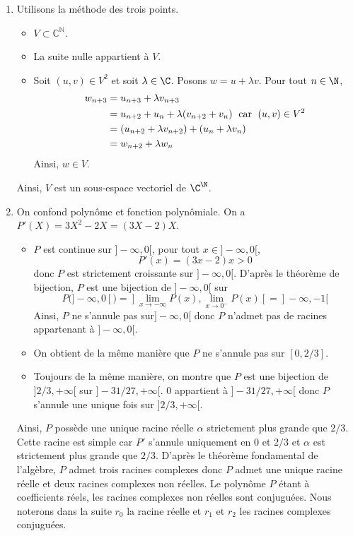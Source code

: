 \documentclass[a4paper,10pt]{report}
\begin{document}
\corr \begin{enumerate}
 \item Utilisons la méthode des trois points.
 \begin{itemize}
 \item $V \subset \mathbb{C}^{\mathbb{N}}$.
 \item La suite nulle appartient à $V$.
 \item Soit $(u,v)\in V^2$ et soit $\lambda\in\C$. Posons $w=u + \lambda v$. Pour tout $n\in\N$, 
 \begin{align*}
 w_{n+3} & =u_{n+3}+\lambda v_{n+3} \\
 & =u_{n+2}+u_n+\lambda(v_{n+2}+v_n) \; \hbox{ car } \; (u,v)\in V^2 \\
 & =(u_{n+2}+\lambda v_{n+2})+(u_n+\lambda v_n) \\
 & =w_{n+2}+\lambda w_n
 \end{align*}
 Ainsi, $w \in V$. 
 \end{itemize}
Ainsi, $V$ est un sous-espace vectoriel de $\C^\N$.
 \item On confond polynôme et fonction polynômiale. On a $P'(X)=3X^2-2X=(3X-2)X$.
 \begin{itemize}
\item $P$ est continue sur $]-\infty,0[$, pour tout $x \in ]-\infty,0[$,
$$ P'(x) = (3x-2)x>0$$
donc $P$ est strictement croissante sur $]-\infty,0[$. D'après le théorème de bijection, $P$ est une bijection de $]-\infty,0[$ sur 
$$ P(]-\infty,0[)=  ]\lim_{x \rightarrow - \infty} P(x), \lim_{x \rightarrow 0^{-}} P(x)[=   ]-\infty,-1[$$
Ainsi, $P$ ne s'annule pas sur$]-\infty,0[$ donc $P$ n'admet pas de racines appartenant à $]-\infty,0[$.
\item On obtient de la même manière que $P$ ne s'annule pas sur $[0, 2/3]$.
\item Toujours de la même manière, on montre que $P$ est une bijection de $]2/3, + \infty[$ sur $]-31/27,+\infty[$. $0$ appartient à $]-31/27,+\infty[$ donc $P$ s'annule une unique fois sur $]2/3, + \infty[$.
\end{itemize}
Ainsi, $P$ possède une unique racine réelle $\alpha$ strictement plus grande que $2/3$. Cette racine est simple car $P'$ s'annule uniquement en $0$ et $2/3$ et $\alpha$ est strictement plus grande que $2/3$. D'après le théorème fondamental de l'algèbre, $P$ admet trois racines complexes donc $P$ admet une unique racine réelle et deux racines complexes non réelles. Le polynôme $P$ étant à coefficients réels, les racines complexes non réelles sont conjuguées. Nous noterons dans la suite $r_0$ la racine réelle et $r_1$ et $r_2$ les racines complexes conjuguées.

\end{enumerate}
\end{document}
